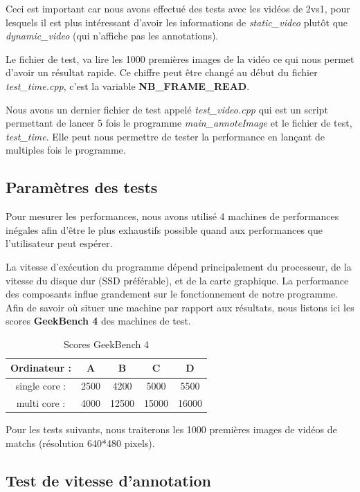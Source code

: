 Ceci est important car nous avons effectué des tests avec les
vidéos de 2vs1, pour lesquels il est plus intéressant d'avoir les
informations de \textit{static\_video} plutôt que
\textit{dynamic\_video} (qui n'affiche pas les annotations).
\bigskip

Le fichier de test, va lire les 1000 premières images de la vidéo
ce qui nous permet d'avoir un résultat rapide. Ce chiffre peut
être changé au début du fichier \textit{test\_time.cpp}, c'est la
variable \textbf{NB\_FRAME\_READ}.
\bigskip

Nous avons un dernier fichier de test appelé 
\textit{test\_video.cpp} qui est un script permettant de lancer 5
fois le programme \textit{main\_annoteImage} et le fichier de
test, \textit{test\_time}. Elle peut nous permettre de tester la
performance en lançant de multiples fois le programme.


\subsection{Paramètres des tests}

Pour mesurer les performances, nous avons utilisé 4 machines de
performances inégales afin d'être le plus exhaustifs possible
quand aux performances que l'utilisateur peut espérer.
\bigskip

La vitesse d'exécution du programme dépend principalement du
processeur, de la vitesse du disque dur (SSD préférable), et de
la carte graphique. La performance des composants influe
grandement sur le fonctionnement de notre programme.
Afin de savoir où situer une machine par rapport aux résultats,
nous listons ici les scores \textbf{GeekBench 4} des machines de
test. 

\begin{table}[H]
\centering
\caption{Scores GeekBench 4} 
\bigskip
\begin{tabular}{| c | c | c | c | c |}
     \hline
     Ordinateur : & A & B & C & D \\ \hline
     single core : & 2500 & 4200 & 5000 & 5500 \\ \hline
     multi core : & 4000 & 12500 & 15000 & 16000 \\ \hline
\end{tabular}
\end{table}


Pour les tests suivants, nous traiterons les 1000 premières
images de vidéos de matchs (résolution 640*480 pixels).


\subsection{Test de vitesse d'annotation}
\label{vitesse_annotation}


